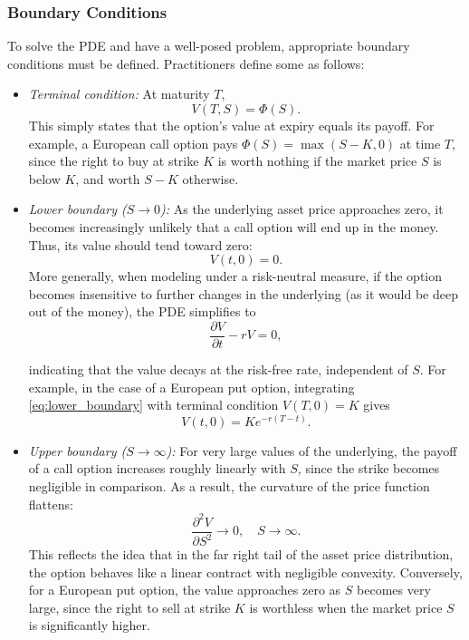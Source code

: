 \documentclass[12pt]{report} %
\theoremstyle{plain} %
\theoremstyle{definition} %
\theoremstyle{remark} %
\begin{document}
\subsubsection{Boundary Conditions}

To solve the PDE and have a well-posed problem, appropriate boundary conditions must be defined. Practitioners
define some as follows:

\begin{itemize}
 \item \textit{Terminal condition:} At maturity \(T\),
 \[
 V(T,S)=\Phi(S).
 \]
 This simply states that the option's value at expiry equals its payoff. For example, a European call option pays \(\Phi(S)=\max(S-K,0)\) at time \(T\), since the right to buy at strike \(K\) is worth nothing if the market price \(S\) is below \(K\), and worth \(S-K\) otherwise.

 \item \textit{Lower boundary (\(S\to 0\)):} As the underlying asset price approaches zero, it becomes increasingly unlikely that a call option will end up in the money. Thus, its value should tend toward zero:
 \[
 V(t,0)=0.
 \]
 More generally, when modeling under a risk-neutral measure, if the option becomes insensitive to further changes in the underlying (as it would be deep out of the money), the PDE simplifies to
 \begin{equation}\label{eq:lower_boundary}
	\frac{\partial V}{\partial t} - rV = 0,
 \end{equation}
 
 indicating that the value decays at the risk-free rate, independent of \(S\). For example, in the case of a European put option,
 integrating \eqref{eq:lower_boundary} with terminal condition \(V(T,0)=K\) gives
 \[ V(t,0)=Ke^{-r(T-t)}. \]

 \item \textit{Upper boundary (\(S\to\infty\)):} For very large values of the underlying, the payoff of a call option increases roughly linearly with \(S\), since the strike becomes negligible in comparison. As a result, the curvature of the price function flattens:
 \[
 \frac{\partial^{2} V}{\partial S^{2}} \to 0,\quad S \to \infty.
 \]
 This reflects the idea that in the far right tail of the asset price distribution, the option behaves like a linear contract with negligible convexity. Conversely, 
 for a European put option, the value approaches zero as \(S\) becomes very large, since the right to sell at strike \(K\) 
 is worthless when the market price \(S\) is significantly higher.
\end{itemize}
\end{document}
